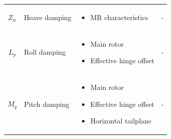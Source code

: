 \documentclass[
]{book}
\providecommand{\tightlist}{%
  \setlength{\itemsep}{0pt}\setlength{\parskip}{0pt}}
\begin{document}
\begin{longtable}[]{@{}cllc@{}}
\begin{minipage}[t]{0.18\columnwidth}
\(Z_w\)\strut
\end{minipage} & \begin{minipage}[t]{0.19\columnwidth}\raggedright
Heave damping\strut
\end{minipage} & \begin{minipage}[t]{0.31\columnwidth}\raggedright
\begin{itemize}
\tightlist
\item
  MR characteristics
\end{itemize}\strut
\end{minipage} & \begin{minipage}[t]{0.20\columnwidth}\centering
-\strut
\end{minipage}\tabularnewline
\begin{minipage}[t]{0.18\columnwidth}\centering
\(L_p\)\strut
\end{minipage} & \begin{minipage}[t]{0.19\columnwidth}\raggedright
Roll damping\strut
\end{minipage} & \begin{minipage}[t]{0.31\columnwidth}\raggedright
\begin{itemize}
\tightlist
\item
  Main rotor
\item
  Effective hinge offset
\end{itemize}\strut
\end{minipage} & \begin{minipage}[t]{0.20\columnwidth}\centering
-\strut
\end{minipage}\tabularnewline
\begin{minipage}[t]{0.18\columnwidth}\centering
\(M_q\)\strut
\end{minipage} & \begin{minipage}[t]{0.19\columnwidth}\raggedright
Pitch damping\strut
\end{minipage} & \begin{minipage}[t]{0.31\columnwidth}\raggedright
\begin{itemize}
\tightlist
\item
  Main rotor
\item
  Effective hinge offset
\item
  Horizontal tailplane
\end{itemize}\strut
\end{minipage} & \begin{minipage}[t]{0.20\columnwidth}\centering
-\strut
\end{minipage}\tabularnewline

\end{longtable}
\end{document}
